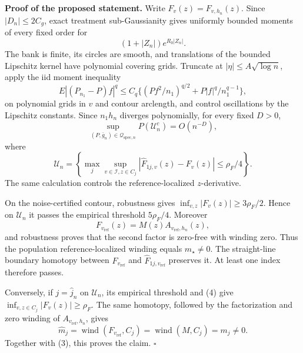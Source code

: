 \textbf{Proof of the proposed statement.}
Write \(F_v(z)=F_{v,h_n}(z)\).  Since \(|D_n|\le2C_g\), exact treatment sub-Gaussianity gives uniformly bounded moments of every fixed order for
\[
 (1+|Z_n|)e^{R_0|Z_n|}. \tag{1}
\]
The bank is finite, its circles are smooth, and translations of the bounded Lipschitz kernel have polynomial covering grids.  Truncate at \(|\eta|\le A\sqrt{\log n}\), apply the iid moment inequality
\[
 E|(P_{n_1}-P)f|^q
 \le C_q\{(Pf^2/n_1)^{q/2}+P|f|^q/n_1^{q-1}\}, \tag{2}
\]
on polynomial grids in \(v\) and contour arclength, and control oscillations by the Lipschitz constants.  Since \(n_1h_n\) diverges polynomially, for every fixed \(D>0\),
\[
 \sup_{(P,\bar g_n)\in\mathcal Q_{\mathrm{spec},n}}P(\mathcal U_n^c)=O(n^{-D}), \tag{3}
\]
where
\[
 \mathcal U_n=\left\{\max_j\sup_{v\in\mathcal I,z\in C_j}
 |\widehat F_{1j,v}(z)-F_v(z)|\le\rho_F/4\right\}. \tag{4}
\]
The same calculation controls the reference-localized \(z\)-derivative.

On the noise-certified contour, robustness gives \(\inf_{v,z}|F_v(z)|\ge3\rho_F/2\).  Hence on \(\mathcal U_n\) it passes the empirical threshold \(5\rho_F/4\).  Moreover
\[
 F_{v_{\mathrm{ref}}}(z)=M(z)A_{v_{\mathrm{ref}},h_n}(z),
\]
and robustness proves that the second factor is zero-free with winding zero.  Thus the population reference-localized winding equals \(m_\star\ne0\).  The straight-line boundary homotopy between \(F_{v_{\mathrm{ref}}}\) and \(\widehat F_{1j,v_{\mathrm{ref}}}\) preserves it.  At least one index therefore passes.

Conversely, if \(j=\widehat j_n\) on \(\mathcal U_n\), its empirical threshold and (4) give \(\inf_{v,z\in C_j}|F_v(z)|\ge\rho_F\).  The same homotopy, followed by the factorization and zero winding of \(A_{v_{\mathrm{ref}},h_n}\), gives
\[
 \widehat m_j=\operatorname{wind}(F_{v_{\mathrm{ref}}},C_j)
 =\operatorname{wind}(M,C_j)=m_j\ne0. \tag{5}
\]
Together with (3), this proves the claim. \(\square\)